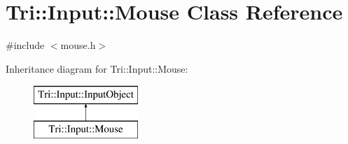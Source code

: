 \hypertarget{class_tri_1_1_input_1_1_mouse}{}\section{Tri\+:\+:Input\+:\+:Mouse Class Reference}
\label{class_tri_1_1_input_1_1_mouse}


{\ttfamily \#include $<$mouse.\+h$>$}

Inheritance diagram for Tri\+:\+:Input\+:\+:Mouse\+:\begin{figure}[H]
\begin{center}
\leavevmode
\includegraphics[height=2.000000cm]{class_tri_1_1_input_1_1_mouse}
\end{center}
\end{figure}
